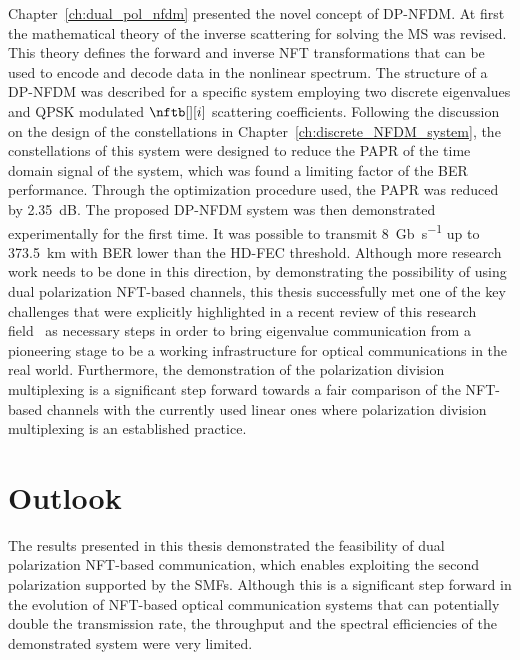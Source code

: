 Chapter~\ref{ch:dual_pol_nfdm} presented the novel concept of \ac{DP-NFDM}. At first
the mathematical theory of the inverse scattering for solving the \ac{MS} was
revised. This theory defines the forward and inverse \ac{NFT} transformations that
can be used to encode  and decode data in the nonlinear spectrum. The structure
of a \ac{DP-NFDM} was described for a specific system employing two discrete
eigenvalues and \ac{QPSK} modulated $\nftb[][i]$ scattering coefficients. Following
the discussion on the design of the constellations in
Chapter~\ref{ch:discrete_NFDM_system}, the constellations of this system were
designed to reduce  the \ac{PAPR} of the time domain signal of the system, which was
found a limiting factor of the \ac{BER} performance. Through the optimization procedure used, the \ac{PAPR} was reduced by \SI{2.35}{\dB}. The proposed \ac{DP-NFDM} system was
then demonstrated experimentally for the first time. It was possible to transmit
\SI{8}{Gb\per\s} up to \SI{373.5}{km} with \ac{BER} lower than the \ac{HD-FEC} threshold. Although more research work needs to be
done in this direction, by demonstrating the possibility of using dual
polarization \ac{NFT}-based channels, this thesis successfully met one of the
key challenges that were explicitly highlighted in a recent review of this
research field~\cite{Turitsyn2017} as necessary steps in order to bring
eigenvalue communication from a pioneering stage to be a working infrastructure
for optical communications in the real world. Furthermore, the demonstration of
the polarization division multiplexing is a significant step forward towards a
fair comparison of the \ac{NFT}-based channels with the currently used linear
ones where polarization division multiplexing is an established practice.

\section{Outlook}

The results presented in this thesis demonstrated the feasibility of dual polarization \ac{NFT}-based communication, which enables exploiting the second polarization supported by the \acp{SMF}.
Although this is a significant step forward in the evolution of \ac{NFT}-based optical communication systems that can potentially double the transmission rate, the throughput and the spectral efficiencies  of the demonstrated system were very limited.

